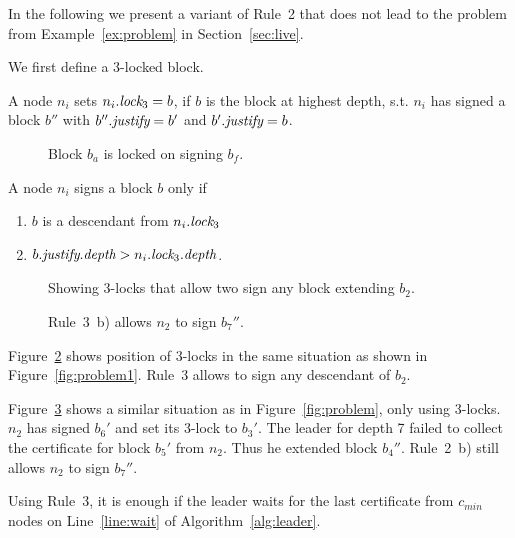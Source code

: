 
\noindent
In the following we present a variant of Rule~2 that does not lead to the problem from Example~\ref{ex:problem} in Section~\ref{sec:live}.

We first define a 3-locked block.
\begin{definition}
A node $n_i$ sets $n_i.\textit{lock}_3=b$, if $b$ is the block at highest depth, s.t. 
$n_i$ has signed a block $b''$ with $b''.\textit{justify}=b'$ and $b'.\textit{justify}=b$.
\end{definition}

\begin{figure}[h!]
	\centering
	
	\caption{Block $b_a$ is locked on signing $b_f$.}
	\label{fig:newlock}
\end{figure}

\begin{Rule}
	A node $n_i$ signs a block $b$ only if 
	\begin{enumerate}[label=\alph*)]
		\item $b$ is a descendant from $n_i.\textit{lock}_3$
		\item $b.\textit{justify}.\textit{depth}>n_i.\textit{lock}_3.\textit{depth}$.  
	\end{enumerate}
\end{Rule}

\begin{figure}[h!]
	\centering
	
	\caption{Showing 3-locks that allow two sign any block extending $b_2$.}
	\label{fig:3locka}
\end{figure}

\begin{figure}[h!]
	\centering
	
	\caption{Rule~3~b) allows $n_2$ to sign $b_7''$.}
	\label{fig:3lockb}
\end{figure}


\begin{example}
	Figure~\ref{fig:3locka} shows position of 3-locks in the same situation as shown in Figure~\ref{fig:problem1}. Rule~3  allows to sign any descendant of $b_2$.
	
Figure~\ref{fig:3lockb} shows a similar situation as in Figure~\ref{fig:problem}, only using 3-locks. $n_2$ has signed $b_6'$ and set its 3-lock to $b_3'$. The leader for depth 7 failed to collect the certificate for block $b_5'$ from $n_2$. Thus he extended block $b_4''$. 
Rule~2~b) still allows $n_2$ to sign $b_7''$.
\end{example}

Using Rule~3, it is enough if the leader waits for the last certificate from $c_{min}$ nodes on Line~\ref{line:wait} of Algorithm~\ref{alg:leader}.


